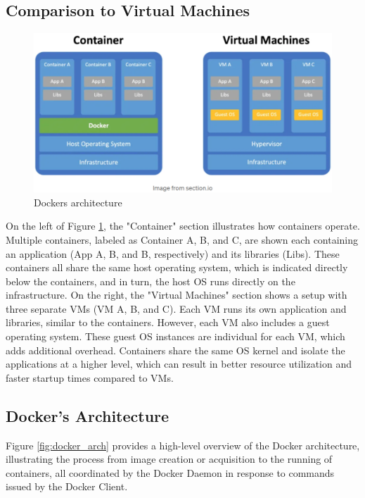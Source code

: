\documentclass{article}
\begin{document}
\subsection{Comparison to Virtual Machines}

\begin{figure}[H]
\includegraphics[scale=.45]{figures/docker_vm.png}
\caption{Dockers architecture}
\label{fig:docker_vm}
\end{figure}

On the left of Figure \ref{fig:docker_vm}, the "Container" section illustrates how containers operate. Multiple containers, labeled as Container A, B, and C, are shown each containing an application (App A, B, and B, respectively) and its libraries (Libs). These containers all share the same host operating system, which is indicated directly below the containers, and in turn, the host OS runs directly on the infrastructure. On the right, the "Virtual Machines" section shows a setup with three separate VMs (VM A, B, and C). Each VM runs its own application and libraries, similar to the containers. However, each VM also includes a guest operating system. These guest OS instances are individual for each VM, which adds additional overhead.  Containers share the same OS kernel and isolate the applications at a higher level, which can result in better resource utilization and faster startup times compared to VMs. 

\subsection{Docker's Architecture}

Figure \ref{fig:docker_arch} provides a high-level overview of the Docker architecture, illustrating the process from image creation or acquisition to the running of containers, all coordinated by the Docker Daemon in response to commands issued by the Docker Client. 
\end{document}
